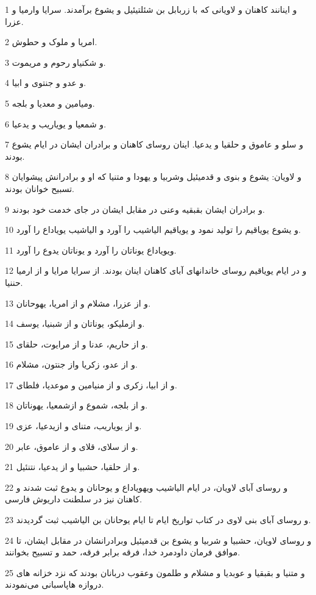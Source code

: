 \par 1 و اینانند کاهنان و لاویانی که با زربابل بن شئلتیئیل و یشوع برآمدند. سرایا وارمیا و عزرا.
\par 2 امریا و ملوک و حطوش.
\par 3 و شکنیاو رحوم و مریموت.
\par 4 و عدو و جنتوی و ابیا.
\par 5 ومیامین و معدیا و بلجه.
\par 6 و شمعیا و یویاریب و یدعیا.
\par 7 و سلو و عاموق و حلقیا و یدعیا. اینان روسای کاهنان و برادران ایشان در ایام یشوع بودند.
\par 8 و لاویان: یشوع و بنوی و قدمیئیل وشربیا و یهودا و متنیا که او و برادرانش پیشوایان تسبیح خوانان بودند.
\par 9 و برادران ایشان بقبقیه وعنی در مقابل ایشان در جای خدمت خود بودند.
\par 10 و یشوع یویاقیم را تولید نمود و یویاقیم الیاشیب را آورد و الیاشیب یویاداع را آورد.
\par 11 ویویاداع یوناتان را آورد و یوناتان یدوع را آورد.
\par 12 و در ایام یویاقیم روسای خاندانهای آبای کاهنان اینان بودند. از سرایا مرایا و از ارمیا حننیا.
\par 13 و از عزرا، مشلام و از امریا، یهوحانان.
\par 14 و ازملیکو، یوناتان و از شبنیا، یوسف.
\par 15 و از حاریم، عدنا و از مرایوت، حلقای.
\par 16 و از عدو، زکریا واز جنتون، مشلام.
\par 17 و از ابیا، زکری و از منیامین و موعدیا، فلطای.
\par 18 و از بلجه، شموع و ازشمعیا، یهوناتان.
\par 19 و از یویاریب، متنای و ازیدعیا، عزی.
\par 20 و از سلای، قلای و از عاموق، عابر.
\par 21 و از حلقیا، حشبیا و از یدعیا، نتنئیل.
\par 22 و روسای آبای لاویان، در ایام الیاشیب ویهویاداع و یوحانان و یدوع ثبت شدند و کاهنان نیز در سلطنت داریوش فارسی. 
\par 23 و روسای آبای بنی لاوی در کتاب تواریخ ایام تا ایام یوحانان بن الیاشیب ثبت گردیدند.
\par 24 و روسای لاویان، حشبیا و شربیا و یشوع بن قدمیئیل وبرادرانشان در مقابل ایشان، تا موافق فرمان داودمرد خدا، فرقه برابر فرقه، حمد و تسبیح بخوانند.
\par 25 و متنیا و بقبقیا و عوبدیا و مشلام و طلمون وعقوب دربانان بودند که نزد خزانه های دروازه هاپاسبانی می‌نمودند.
